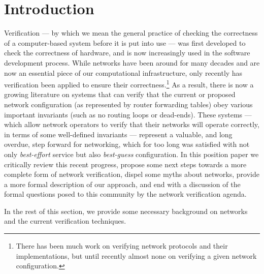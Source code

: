 \section{Introduction}
\label{sec:introduction}

Verification --- by which we mean the general practice of checking the correctness of a computer-based system before it is put into use --- was first developed to
check the correctness of hardware, and is now increasingly used in the software development process. While networks have been around for many decades and are now an essential piece of our computational infrastructure, only recently has verification been applied to ensure their correctness.\footnote{There has been much work on verifying network protocols and their implementations, but until recently almost none on verifying a given network configuration.} As a result, there is now a growing literature on systems that can verify that the current or proposed network configuration (as represented by router forwarding tables) obey various important invariants (such as no routing loops or dead-ends).
These systems --- which allow network operators to verify that their networks will operate correctly, in terms of some well-defined invariants --- represent a valuable, and long overdue, step forward for networking, which for too long was satisfied with not only {\em best-effort} service but also {\em best-guess} configuration. In this position paper we critically review this recent progress, propose some next steps towards a more complete form of network verification, dispel some myths about networks, provide a more formal description of our approach, and end with a discussion of the formal questions posed to this community by the network verification agenda.

In the rest of this section, we provide some necessary background on networks and the current verification techniques. 

